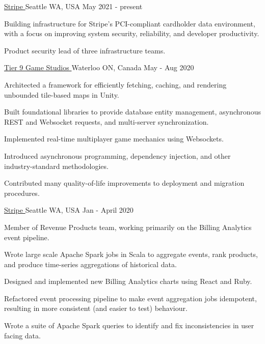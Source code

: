 
\begin{cventries}

  {\href{https://stripe.com}{Stripe \faExternalLink}} {Seattle WA,
    USA} {May 2021 - present} {
    \begin{cvitems}
    \item Building infrastructure for Stripe's PCI-compliant cardholder data environment,
    with a focus on improving system security, reliability, and developer productivity.
    \item Product security lead of three infrastructure teams.
    \end{cvitems}
  }

  {\href{https://www.tier9studios.com}{Tier 9 Game Studios \faExternalLink}} {Waterloo ON,
    Canada} {May - Aug 2020} {
    \begin{cvitems}
    \item Architected a framework for efficiently fetching,  caching, and rendering unbounded tile-based maps in Unity.
    \item Built foundational libraries to provide database entity management,  asynchronous REST and Websocket requests, and multi-server synchronization.
    \item Implemented real-time multiplayer game mechanics using Websockets.
    \item Introduced asynchronous programming, dependency injection, and other industry-standard methodologies.
    \item Contributed many quality-of-life improvements to deployment and migration procedures.
    \end{cvitems}
  }

  {\href{https://stripe.com}{Stripe \faExternalLink}} {Seattle WA,
    USA} {Jan - April 2020} {
    \begin{cvitems}
    \item Member of Revenue Products team, working primarily on the Billing Analytics event pipeline.
	\item Wrote large scale Apache Spark jobs in Scala to aggregate events, rank products, and produce time-series aggregations of historical data.
	\item Designed and implemented new Billing Analytics charts using React and Ruby.
	\item Refactored event processing pipeline to make event aggregation jobs idempotent, resulting in more consistent (and easier to test) behaviour.
	\item Wrote a suite of Apache Spark queries to identify and fix inconsistencies in user facing data.
    \end{cvitems}
  }


\end{cventries}
